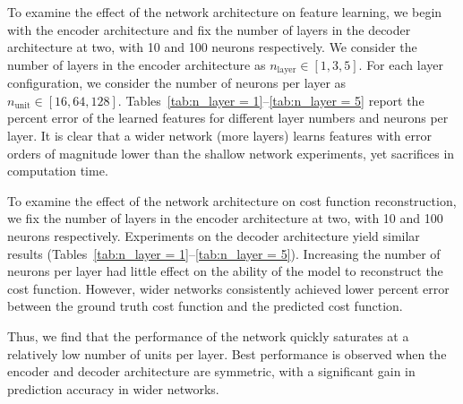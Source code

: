 \documentclass[letterpaper]{article} %
\begin{document}
To examine the effect of the network architecture on feature learning, we begin with the encoder architecture and fix the number of layers in the decoder architecture at two, with 10 and 100 neurons respectively. We consider the number of layers in the encoder architecture as $n_{\text{layer}}\in[1, 3, 5]$. For each layer configuration, we consider the number of neurons per layer as $n_{\text{unit}}\in[16, 64, 128]$. Tables~\ref{tab:n_layer = 1}--\ref{tab:n_layer = 5} report the percent error of the learned features for different layer numbers and neurons per layer. It is clear that a wider network (more layers) learns features with error orders of magnitude lower than the shallow network experiments, yet sacrifices in computation time. 


To examine the effect of the network architecture on cost function reconstruction, we fix the number of layers in the encoder architecture at two, with 10 and 100 neurons respectively. Experiments on the decoder architecture yield similar results (Tables~\ref{tab:n_layer = 1}--\ref{tab:n_layer = 5}). Increasing the number of neurons per layer had little effect on the ability of the model to reconstruct the cost function. However, wider networks consistently achieved lower percent error between the ground truth cost function and the predicted cost function. 

Thus, we find that the performance of the network quickly saturates at a relatively low number of units per layer. Best performance is observed when the encoder and decoder architecture are symmetric, with a significant gain in prediction accuracy in wider networks. 



% 
\end{document}

